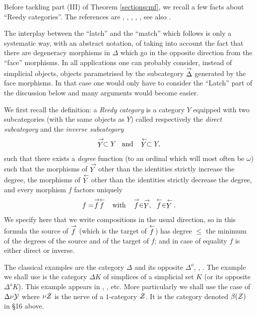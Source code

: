 

Before tackling part (III) of Theorem \ref{sectionscmf},
we recall a few facts about ``Reedy categories''. The
references are
\cite{Reedy}, \cite{BousfieldKan}, \cite{Hirschhorn}, \cite{DHK},
\cite{JardineGoerssBook}, see also \cite{DwyerKan3}.

The interplay between the ``latch'' and the ``match'' which follows is only a
systematic way, with an abstract notation, of taking into account the fact that
there are degeneracy morphisms in $\Delta$ which go in the opposite direction
from the ``face'' morphisms. In all applications one can probably consider,
instead of simplicial objects, objects parametrised by the subcategory
$\stackrel{\rightarrow}{\Delta}$ generated by the face morphisms. In that case one would only
have to consider the ``Latch'' part of the discussion below and many arguments
would become easier.


We first recall the definition: a {\em Reedy category}
is a category $Y$ equipped with two subcategories (with the same objects
as $Y$) called respectively the {\em direct subcategory} and the {\em
inverse subcategory}
$$
\stackrel{\rightarrow}{Y}\subset Y \;\;\; \mbox{and} \;\;\; \stackrel{\leftarrow}{Y}\subset Y,
$$
such that there exists a {\em degree} function (to an ordinal which will most
often be $\omega$) such that the morphisms of $\stackrel{\rightarrow}{Y}$ other than the
identities strictly increase the degree, the morphisms of $\stackrel{\leftarrow}{Y}$ other
than the identities strictly decrease the degree, and every morphism $f$
factors uniquely
$$
f= \stackrel{\rightarrow}{f}\stackrel{\leftarrow}{f} \;\;\; \mbox{with} \;\;\; \stackrel{\rightarrow}{f}\in \stackrel{\rightarrow}{Y},
\;\; \stackrel{\leftarrow}{f}\in \stackrel{\leftarrow}{Y}.
$$
We specify here that we write compositions in the usual direction, so in this
formula the source of $\stackrel{\rightarrow}{f}$ (which is the target of $\stackrel{\leftarrow}{f}$) has
degree $\leq$ the minimum of the degrees of the source and of the target of
$f$; and in case of equality $f$ is either direct or inverse.

The classical examples are the category $\Delta$ and its opposite $\Delta
^o$, \cite{BousfieldKan}, \cite{Reedy}.
The example we shall use is the category $\Delta K$ of simplices of a
simplicial set $K$ (or its opposite $\Delta ^oK$). This example appears
in \cite{Hirschhorn}, \cite{DHK}, etc. More particularly we shall use
the case of $\Delta \nu {\cal Y}$ where $\nu {\cal Z}$ is the nerve of a
$1$-category ${\cal Z}$. It is the category denoted $\beta ({\cal Z} )$ in \S16
above.




